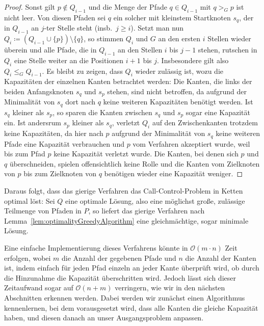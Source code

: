 \begin{proof}
    Sonst gilt $p \notin Q_{i-1}$ und die Menge der Pfade $q \in Q_{i-1}$ mit $q >_G p$ ist nicht leer.
    Von diesen Pfaden sei $q$ ein solcher mit kleinstem Startknoten $s_q$, der in $Q_{i-1}$ an $j$-ter Stelle steht
    (insb.\ $j \geq i$).
    Setzt man nun $Q_{i} \coloneqq (Q_{i-1} \cup \{ p \}) \setminus \{ q \} $, so stimmen $Q_{i}$ und $G$ an den
    ersten $i$ Stellen wieder überein und alle Pfade, die in $Q_{i-1}$ an den Stellen $i$ bis $j-1$ stehen, rutschen
    in $Q_i$ eine Stelle weiter an die Positionen $i+1$ bis $j$.
    Insbesondere gilt also $Q_i \leq_G Q_{i-1}$.
    Es bleibt zu zeigen, dass $Q_i$ wieder zulässig ist, wozu die Kapazitäten der einzelnen Kanten betrachtet werden:
    Die Kanten, die links der beiden Anfangsknoten $s_q$ und $s_p$ stehen, sind nicht betroffen, da aufgrund der Minimalität
    von $s_q$ dort nach $q$ keine weiteren Kapazitäten benötigt werden.
    Ist $s_q$ kleiner als $s_p$, so sparen die Kanten zwischen $s_q$ und $s_p$ sogar eine Kapazität ein.
    Ist andersrum $s_p$ kleiner als $s_q$, verletzt $Q_i$ auf den Zwischenkanten trotzdem keine Kapazitäten, da
    hier nach $p$ aufgrund der Minimalität von $s_q$ keine weiteren Pfade eine Kapazität verbrauchen und $p$ vom
    Verfahren akzeptiert wurde, weil bis zum Pfad $p$ keine Kapazität verletzt wurde.
    Die Kanten, bei denen sich $p$ und $q$ überschneiden, spielen offensichtlich keine Rolle und die Kanten
    vom Zielknoten von $p$ bis zum Zielknoten von $q$ benötigen wieder eine Kapazität weniger.
\end{proof}

Daraus folgt, dass das gierige Verfahren das Call-Control-Problem in Ketten optimal löst:
Sei $Q$ eine optimale Lösung, also eine möglichst große, zulässige Teilmenge von Pfaden in $P$, so liefert das gierige
Verfahren nach Lemma~\ref{lem:optimalityGreedyAlgorithm} eine gleichmächtige, sogar minimale Lösung.

Eine einfache Implementierung dieses Verfahrens könnte in $\mathcal O(m \cdot n)$ Zeit erfolgen, wobei $m$ die Anzahl der gegebenen
Pfade und $n$ die Anzahl der Kanten ist, indem einfach für jeden Pfad einzeln an jeder Kante überprüft wird, ob durch
die Hinzunahme die Kapazität überschritten wird.
Jedoch lässt sich dieser Zeitaufwand sogar auf $\mathcal O(n+m)$ verringern, wie wir in den nächsten Abschnitten erkennen werden.
Dabei werden wir zunächst einen Algorithmus kennenlernen, bei dem vorausgesetzt wird, dass alle Kanten die gleiche
Kapazität haben, und diesen danach an unser Ausgangsproblem anpassen.

